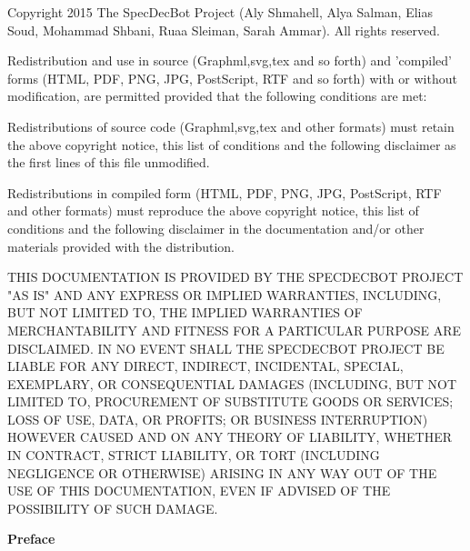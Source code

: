 \documentclass{paper}
\begin{document}
\begin{large}
Copyright 2015 The SpecDecBot Project (Aly Shmahell, Alya Salman, Elias Soud, Mohammad Shbani, Ruaa Sleiman, Sarah Ammar). All rights reserved.

Redistribution and use in source (Graphml,svg,tex and so forth) and 'compiled' forms (HTML, PDF, PNG, JPG, PostScript, RTF and so forth) with or without modification, are permitted provided that the following conditions are met:

Redistributions of source code (Graphml,svg,tex and other formats) must retain the above copyright notice, this list of conditions and the following disclaimer as the first lines of this file unmodified.

Redistributions in compiled form (HTML, PDF, PNG, JPG, PostScript, RTF and other formats) must reproduce the above copyright notice, this list of conditions and the following disclaimer in the documentation and/or other materials provided with the distribution.

THIS DOCUMENTATION IS PROVIDED BY THE SPECDECBOT PROJECT "AS IS" AND ANY EXPRESS OR IMPLIED WARRANTIES, INCLUDING, BUT NOT LIMITED TO, THE IMPLIED WARRANTIES OF MERCHANTABILITY AND FITNESS FOR A PARTICULAR PURPOSE ARE DISCLAIMED. IN NO EVENT SHALL THE SPECDECBOT PROJECT BE LIABLE FOR ANY DIRECT, INDIRECT, INCIDENTAL, SPECIAL, EXEMPLARY, OR CONSEQUENTIAL DAMAGES (INCLUDING, BUT NOT LIMITED TO, PROCUREMENT OF SUBSTITUTE GOODS OR SERVICES; LOSS OF USE, DATA, OR PROFITS; OR BUSINESS INTERRUPTION) HOWEVER CAUSED AND ON ANY THEORY OF LIABILITY, WHETHER IN CONTRACT, STRICT LIABILITY, OR TORT (INCLUDING NEGLIGENCE OR OTHERWISE) ARISING IN ANY WAY OUT OF THE USE OF THIS DOCUMENTATION, EVEN IF ADVISED OF THE POSSIBILITY OF SUCH DAMAGE.
\end{large}
\newpage
\begin{huge}{\textbf{Preface\newline}}\end{huge}
\end{document}
